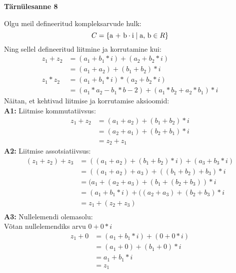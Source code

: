 \documentclass{article}
\begin{document}
\begin{center}
\Large \textbf {Tärnülesanne 8}
\end{center}
Olgu meil defineeritud kompleksarvude hulk:
\begin{equation*}
C= \left \{\textup{a + b}\cdot \textup{i}\mid \textup{a, b} \in R \right \}
\end{equation*}
Ning sellel defineeritud liitmine ja korrutamine kui:
\begin {equation*}
\begin {aligned}
z_1+z_2&=(a_1+b_1*i)+(a_2+b_2*i)\\
&=(a_1+a_2)+(b_1+b_2)*i\\
z_1*z_2&=(a_1+b_1*i)*(a_2+b_2*i)\\
&=(a_1*a_2-b_1*b-2)+(a_1*b_2+a_2*b_1)*i
\end {aligned}
\end{equation*}
Näitan, et kehtivad liitmise ja korrutamise aksioomid:\\
\textbf{A1:} Liitmise kommutatiivsus:
\begin {equation*}
\begin {aligned}
z_1+z_2&=(a_1+a_2)+(b_1+b_2)*i\\
&=(a_2+a_1)+(b_2+b_1)*i\\
&=z_2+z_1
\end {aligned}
\end {equation*}
\textbf{A2:} Liitmise assotsiatiivsus:
\begin {equation*}
\begin {aligned}
(z_1+z_2)+z_3&=((a_1+a_2)+(b_1+b_2)*i)+(a_3+b_3*i)\\
&=((a_1+a_2)+a_3)+((b_1+b_2)+b_3)*i\\
&=(a_1+(a_2+a_3)+(b_1+(b_2+b_3))*i\\
&=(a_1+b_1*i)+((a_2+a_3)+(b_2+b_3)*i\\
&=z_1+(z_2+z_3)\\
\end {aligned}
\end {equation*}
\textbf{A3:} Nullelemendi olemasolu:\\
Võtan nullelemendiks arvu $0+0*i$
\begin {equation*}
\begin {aligned}
z_1+0&=(a_1+b_1*i)+(0+0*i)\\
&=(a_1+0)+(b_1+0)*i\\
&=a_1+b_1*i\\
&=z_1
\end {aligned}
\end {equation*}
\end{document}
